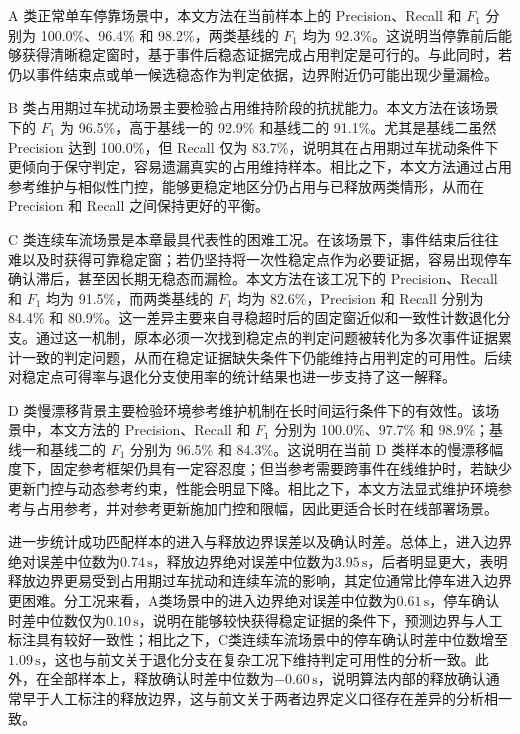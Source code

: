 \documentclass{xdupgthesis}
\begin{document}
A 类正常单车停靠场景中，本文方法在当前样本上的 Precision、Recall 和 $F_1$ 分别为 100.0\%、96.4\% 和 98.2\%，两类基线的 $F_1$ 均为 92.3\%。这说明当停靠前后能够获得清晰稳定窗时，基于事件后稳态证据完成占用判定是可行的。与此同时，若仍以事件结束点或单一候选稳态作为判定依据，边界附近仍可能出现少量漏检。

B 类占用期过车扰动场景主要检验占用维持阶段的抗扰能力。本文方法在该场景下的 $F_1$ 为 96.5\%，高于基线一的 92.9\% 和基线二的 91.1\%。尤其是基线二虽然 Precision 达到 100.0\%，但 Recall 仅为 83.7\%，说明其在占用期过车扰动条件下更倾向于保守判定，容易遗漏真实的占用维持样本。相比之下，本文方法通过占用参考维护与相似性门控，能够更稳定地区分仍占用与已释放两类情形，从而在 Precision 和 Recall 之间保持更好的平衡。

C 类连续车流场景是本章最具代表性的困难工况。在该场景下，事件结束后往往难以及时获得可靠稳定窗；若仍坚持将一次性稳定点作为必要证据，容易出现停车确认滞后，甚至因长期无稳态而漏检。本文方法在该工况下的 Precision、Recall 和 $F_1$ 均为 91.5\%，而两类基线的 $F_1$ 均为 82.6\%，Precision 和 Recall 分别为 84.4\% 和 80.9\%。这一差异主要来自寻稳超时后的固定窗近似和一致性计数退化分支。通过这一机制，原本必须一次找到稳定点的判定问题被转化为多次事件证据累计一致的判定问题，从而在稳定证据缺失条件下仍能维持占用判定的可用性。后续对稳定点可得率与退化分支使用率的统计结果也进一步支持了这一解释。

D 类慢漂移背景主要检验环境参考维护机制在长时间运行条件下的有效性。该场景中，本文方法的 Precision、Recall 和 $F_1$ 分别为 100.0\%、97.7\% 和 98.9\%；基线一和基线二的 $F_1$ 分别为 96.5\% 和 84.3\%。这说明在当前 D 类样本的慢漂移幅度下，固定参考框架仍具有一定容忍度；但当参考需要跨事件在线维护时，若缺少更新门控与动态参考约束，性能会明显下降。相比之下，本文方法显式维护环境参考与占用参考，并对参考更新施加门控和限幅，因此更适合长时在线部署场景。

进一步统计成功匹配样本的进入与释放边界误差以及确认时差。总体上，进入边界绝对误差中位数为$0.74\,\mathrm{s}$，释放边界绝对误差中位数为$3.95\,\mathrm{s}$，后者明显更大，表明释放边界更易受到占用期过车扰动和连续车流的影响，其定位通常比停车进入边界更困难。分工况来看，A类场景中的进入边界绝对误差中位数为$0.61\,\mathrm{s}$，停车确认时差中位数仅为$0.10\,\mathrm{s}$，说明在能够较快获得稳定证据的条件下，预测边界与人工标注具有较好一致性；相比之下，C类连续车流场景中的停车确认时差中位数增至$1.09\,\mathrm{s}$，这也与前文关于退化分支在复杂工况下维持判定可用性的分析一致。此外，在全部样本上，释放确认时差中位数为$-0.60\,\mathrm{s}$，说明算法内部的释放确认通常早于人工标注的释放边界，这与前文关于两者边界定义口径存在差异的分析相一致。
\end{document}
